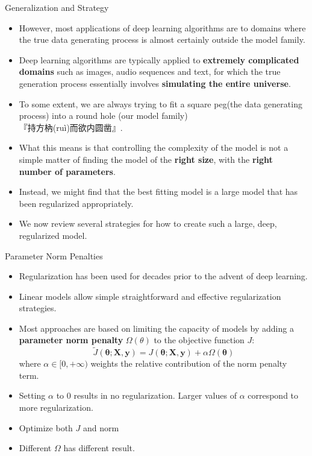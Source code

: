 \documentclass[10pt]{beamer}
\begin{document}
	\begin{frame}{Generalization and Strategy}
		\begin{itemize}
			\item However, most applications of deep learning algorithms are to domains where the true data generating process is almost certainly outside the model family.
			\pause
			\item Deep learning algorithms are typically applied to \textbf{extremely complicated domains} such as images, audio sequences and text, for which the true generation process essentially involves \textbf{simulating the entire universe}.
			\pause
			\item To some extent, we are always trying to fit a square peg(the data generating process) into a round hole (our model family)\\ 『持方枘(ruì)而欲内圆凿』.
			\pause
			\item What this means is that controlling the complexity of the model is not a simple matter of finding the model of the \textbf{right size}, with the \textbf{right number of parameters}.
			\pause
			\item Instead, we might find that the best fitting model is a large model that has been regularized appropriately.
			\pause
			\item We now review several strategies for how to create such a large, deep, regularized model.
		\end{itemize}
	\end{frame}
	
	\begin{frame}{Parameter Norm Penalties}
		\begin{itemize}
			\pause
			\item Regularization has been used for decades prior to the advent of deep learning.
			\pause
			\item Linear models allow simple straightforward and effective regularization strategies.
			\pause
			\item Most approaches are based on limiting the capacity of models by adding a \textbf{parameter norm penalty} $\Omega(\theta)$ to the objective function $J$:
			$$\tilde{\mathit{J}}(\bm{\theta};\bm{X},\bm{y})=\mathit{J}(\bm{\theta};\bm{X},\bm{y})+\alpha\Omega(\bm{\theta})$$
			where $\alpha\in[0,+\infty)$ weights the relative contribution of the norm penalty term.
			\pause
			\item Setting $\alpha$ to 0 results in no regularization. Larger values of $\alpha$ correspond to more regularization.
			\pause
			\item Optimize both $J$ and norm
			\pause
			\item Different $\Omega$ has different result.
		\end{itemize}
	\end{frame}
	
\end{document}

